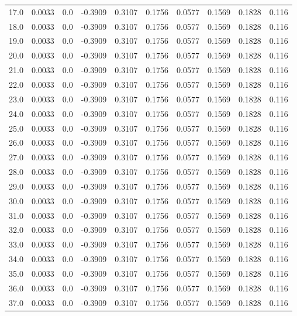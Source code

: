 \begin{longtable}{lrrrrrrrrr}
17.0 & 0.0033 & 0.0 & -0.3909 & 0.3107 & 0.1756 & 0.0577 & 0.1569 & 0.1828 & 0.116 \\
18.0 & 0.0033 & 0.0 & -0.3909 & 0.3107 & 0.1756 & 0.0577 & 0.1569 & 0.1828 & 0.116 \\
19.0 & 0.0033 & 0.0 & -0.3909 & 0.3107 & 0.1756 & 0.0577 & 0.1569 & 0.1828 & 0.116 \\
20.0 & 0.0033 & 0.0 & -0.3909 & 0.3107 & 0.1756 & 0.0577 & 0.1569 & 0.1828 & 0.116 \\
21.0 & 0.0033 & 0.0 & -0.3909 & 0.3107 & 0.1756 & 0.0577 & 0.1569 & 0.1828 & 0.116 \\
22.0 & 0.0033 & 0.0 & -0.3909 & 0.3107 & 0.1756 & 0.0577 & 0.1569 & 0.1828 & 0.116 \\
23.0 & 0.0033 & 0.0 & -0.3909 & 0.3107 & 0.1756 & 0.0577 & 0.1569 & 0.1828 & 0.116 \\
24.0 & 0.0033 & 0.0 & -0.3909 & 0.3107 & 0.1756 & 0.0577 & 0.1569 & 0.1828 & 0.116 \\
25.0 & 0.0033 & 0.0 & -0.3909 & 0.3107 & 0.1756 & 0.0577 & 0.1569 & 0.1828 & 0.116 \\
26.0 & 0.0033 & 0.0 & -0.3909 & 0.3107 & 0.1756 & 0.0577 & 0.1569 & 0.1828 & 0.116 \\
27.0 & 0.0033 & 0.0 & -0.3909 & 0.3107 & 0.1756 & 0.0577 & 0.1569 & 0.1828 & 0.116 \\
28.0 & 0.0033 & 0.0 & -0.3909 & 0.3107 & 0.1756 & 0.0577 & 0.1569 & 0.1828 & 0.116 \\
29.0 & 0.0033 & 0.0 & -0.3909 & 0.3107 & 0.1756 & 0.0577 & 0.1569 & 0.1828 & 0.116 \\
30.0 & 0.0033 & 0.0 & -0.3909 & 0.3107 & 0.1756 & 0.0577 & 0.1569 & 0.1828 & 0.116 \\
31.0 & 0.0033 & 0.0 & -0.3909 & 0.3107 & 0.1756 & 0.0577 & 0.1569 & 0.1828 & 0.116 \\
32.0 & 0.0033 & 0.0 & -0.3909 & 0.3107 & 0.1756 & 0.0577 & 0.1569 & 0.1828 & 0.116 \\
33.0 & 0.0033 & 0.0 & -0.3909 & 0.3107 & 0.1756 & 0.0577 & 0.1569 & 0.1828 & 0.116 \\
34.0 & 0.0033 & 0.0 & -0.3909 & 0.3107 & 0.1756 & 0.0577 & 0.1569 & 0.1828 & 0.116 \\
35.0 & 0.0033 & 0.0 & -0.3909 & 0.3107 & 0.1756 & 0.0577 & 0.1569 & 0.1828 & 0.116 \\
36.0 & 0.0033 & 0.0 & -0.3909 & 0.3107 & 0.1756 & 0.0577 & 0.1569 & 0.1828 & 0.116 \\
37.0 & 0.0033 & 0.0 & -0.3909 & 0.3107 & 0.1756 & 0.0577 & 0.1569 & 0.1828 & 0.116 \\

\end{longtable}
